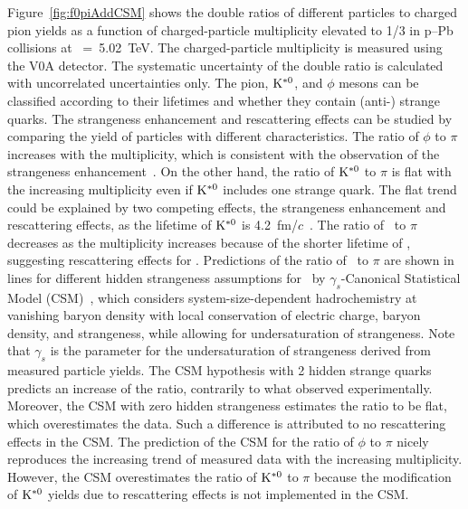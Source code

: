 Figure~\ref{fig:f0piAddCSM} shows the double ratios of different particles to charged pion yields as a function of charged-particle multiplicity elevated to 1/3 in p--Pb collisions at \snn~=~5.02~TeV. The charged-particle multiplicity is measured using the V0A detector. The systematic uncertainty of the double ratio is calculated with uncorrelated uncertainties only. The pion, $\rm{}K^{*0}$, and $\phi$ mesons can be classified according to their lifetimes and whether they contain (anti-) strange quarks. The strangeness enhancement and rescattering effects can be studied by comparing the yield of particles with different characteristics. The ratio of $\phi$ to $\pi$ increases with the multiplicity, which is consistent with the observation of the strangeness enhancement~\cite{ALICE:2016fzo}. On the other hand, the ratio of $\rm{}K^{*0}$ to $\pi$ is flat with the increasing multiplicity even if $\rm{}K^{*0}$ includes one strange quark. The flat trend could be explained by two competing effects, the strangeness enhancement and rescattering effects, as the lifetime of $\rm{}K^{*0}$ is 4.2~fm/$c$~\cite{ParticleDataGroup:2020ssz}. The ratio of \fzero~to $\pi$ decreases as the multiplicity increases because of the shorter lifetime of \fzero, suggesting rescattering effects for \fzero. Predictions of the ratio of \fzero~to $\pi$ are shown in lines for different hidden strangeness assumptions for \fzero~by $\gamma_{s}$-Canonical Statistical Model (CSM)~\cite{Vovchenko:2019kes}, which considers system-size-dependent hadrochemistry at vanishing baryon density with local conservation of electric charge, baryon density, and strangeness, while allowing for undersaturation of strangeness. Note that $\gamma_{s}$ is the parameter for the undersaturation of strangeness derived from measured particle yields. The CSM hypothesis with 2 hidden strange quarks predicts an increase of the ratio, contrarily to what observed experimentally. Moreover, the CSM with zero hidden strangeness estimates the ratio to be flat, which overestimates the data. Such a difference is attributed to no rescattering effects in the CSM. The prediction of the CSM for the ratio of $\phi$ to $\pi$ nicely reproduces the increasing trend of measured data with the increasing multiplicity. However, the CSM overestimates the ratio of $\rm{}K^{*0}$ to $\pi$ because the modification of $\rm{}K^{*0}$ yields due to rescattering effects is not implemented in the CSM.

